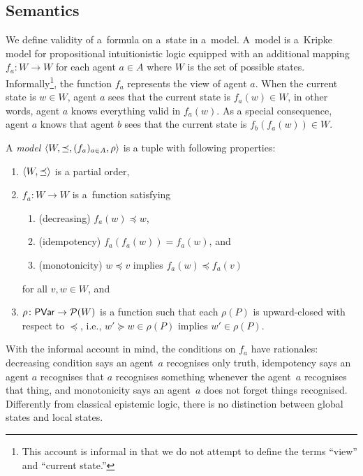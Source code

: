   \subsection{Semantics}
  We define validity of a~formula on a~state in a~model.
  A~model is a~Kripke model for propositional intuitionistic logic
  equipped with an additional
  mapping $f_a: W\rightarrow W$ for each agent $a\in A$ where $W$ is the
  set of possible states.
  Informally\footnote{This account is informal in that we do not attempt to
  define the terms ``view'' and ``current state.''},
  the function $f_a$ represents the view of agent
  $a$.
  When the current state is $w\in W$\kern -2pt, agent $a$ sees that the current state is
  $f_a(w)\in W$, in other words, agent $a$ knows everything valid in $f_a(w)$.
  As a special consequence, agent $a$ knows that agent $b$ sees that the current state
  is
  $f_b(f_a(w))\in W$\kern -2pt.

  \newcommand{\model}[1]{\tuple{W#1, \preceq#1, (f_a#1)_{a\in A}, \rho#1}}
  \begin{definition}
   \label{model}
   A \textit{model} $\langle{W,\preceq, (f_a)_{a\in A}, \rho}\rangle$ is a tuple with following properties:
   \begin{enumerate}
    \item $\langle{W,\preceq}\rangle$ is a partial order,
    \item $f_a\colon W\rightarrow W$ is a~function satisfying
	  \begin{enumerate}
	   \item (decreasing) $f_a(w) \preceq w$,
	   \item (idempotency) $f_a(f_a(w)) = f_a(w)$, and
	   \item (monotonicity) $w\preceq v$ implies $f_a(w)\preceq f_a(v)$
	  \end{enumerate}
	  for all $v,w\in W$, and
    \item $\rho\colon \mathsf{PVar}\rightarrow {\mathcal P({W})}$ is a function such that each $\rho(P)$ is
	  upward-closed with respect to $\preceq$, i.e., $w'\succeq w\in\rho(P)$ implies
	  $w'\in\rho(P)$.
   \end{enumerate}
  \end{definition}
  \noindent With the informal account in mind, the conditions on $f_a$ have rationales:
  decreasing condition says an agent~$a$ recognises only truth,
  idempotency says an agent $a$ recognises that
       $a$ recognises something whenever the agent~$a$ recognises that thing,
       and monotonicity says an agent~$a$ does not forget things recognised.
       Differently from classical epistemic logic,
       there is no distinction between global states and local states.

